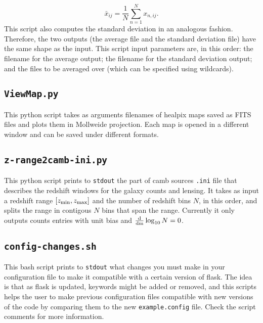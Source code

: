 \documentclass[12pt]{book} %
\begin{document}
\begin{equation}
\bar{x}_{ij} = \frac{1}{N}\sum_{n=1}^{N}x_{n,ij}.
\label{eq:average}
\end{equation}
This script also computes the standard deviation in an analogous fashion. 
Therefore, the two outputs (the average file and the standard deviation file) have 
the same shape as the input. This script input parameters are, in this order: 
the filename for the average output; the filename for the standard deviation output; 
and the files to be averaged over (which can be specified using wildcards).

\subsection{{\tt ViewMap.py}}
\label{sec:viewmap}

This {\sc python} script takes as arguments filenames of {\sc healpix} maps saved as FITS files 
and plots them in Mollweide projection. Each map is opened in a different window and can be 
saved under different formats.

\subsection{{\tt z-range2camb-ini.py}}
\label{sec:zrange2camb}

This {\sc python} script prints to {\tt stdout} the part of {\sc camb sources} {\tt .ini} file 
that describes the redshift windows for the galaxy counts and lensing. It takes as input a 
redshift range $[z_{\rm{min}}, z_{\rm{max}}]$ and the number of redshift bins $N$, in this order,
and splits the range in contigous $N$ bins that span the range. Currently it only outputs 
counts entries with unit bias and $\frac{\rm{d}}{\rm{d}m}\log_{10}N=0$.   

\subsection{{\tt config-changes.sh}}
\label{sec:config-changes}

This {\sc bash} script prints to {\tt stdout} what changes you must make in your 
configuration file to make it compatible with a certain version of {\sc flask}. 
The idea is that as {\sc flask} is updated, keywords might be added or removed, 
and this scripts helps the user to make previous configuration files compatible 
with new versions of the code by comparing them to the new {\tt example.config} 
file. Check the script comments for more information.   
\end{document}
